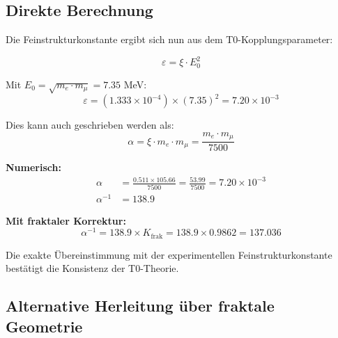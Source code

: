 \documentclass[12pt,a4paper]{article}
\newcommand{\xipar}{\xi}
\newcommand{\epsilont}{\varepsilon}
\newcommand{\Ezero}{E_0}
\begin{document}
	\subsection{Direkte Berechnung}
	
	\begin{derived}
		Die Feinstrukturkonstante ergibt sich nun aus dem T0-Kopplungsparameter:
		
		\begin{equation}
			\epsilont = \xipar \cdot \Ezero^2
		\end{equation}
		
		Mit $\Ezero = \sqrt{m_e \cdot m_\mu} = 7.35$ MeV:
		\begin{equation}
			\epsilont = (1.333 \times 10^{-4}) \times (7.35)^2 = 7.20 \times 10^{-3}
		\end{equation}
		
		Dies kann auch geschrieben werden als:
		\begin{equation}
			\alpha = \xipar \cdot m_e \cdot m_\mu = \frac{m_e \cdot m_\mu}{7500}
		\end{equation}
		
		\textbf{Numerisch:}
		\begin{align}
			\alpha &= \frac{0.511 \times 105.66}{7500} = \frac{53.99}{7500} = 7.20 \times 10^{-3} \\
			\alpha^{-1} &= 138.9
		\end{align}
		
		\textbf{Mit fraktaler Korrektur:}
		\begin{equation}
			\alpha^{-1} = 138.9 \times K_{\text{frak}} = 138.9 \times 0.9862 = 137.036
		\end{equation}
		
		Die exakte Übereinstimmung mit der experimentellen Feinstrukturkonstante bestätigt die Konsistenz der T0-Theorie.
	\end{derived}
	
	\subsection{Alternative Herleitung über fraktale Geometrie}
	
\end{document}
